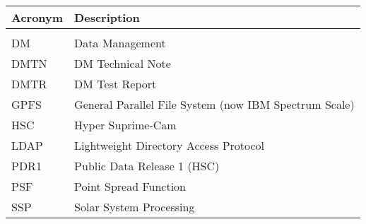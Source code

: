 \addtocounter{table}{-1}
\begin{longtable}{p{}p{}}\hline
\textbf{Acronym} & \textbf{Description}  \\\hline

 &  \\\hline
DM & Data Management \\\hline
DMTN & DM Technical Note \\\hline
DMTR & DM Test Report \\\hline
GPFS & General Parallel File System (now IBM Spectrum Scale) \\\hline
HSC & Hyper Suprime-Cam \\\hline
LDAP & Lightweight Directory Access Protocol \\\hline
PDR1 & Public Data Release 1 (HSC) \\\hline
PSF & Point Spread Function \\\hline
SSP & Solar System Processing \\\hline
\end{longtable}
